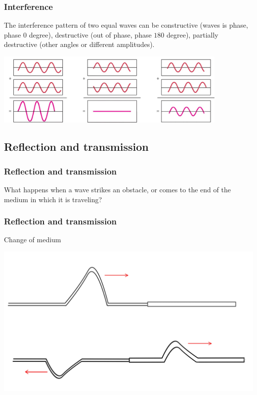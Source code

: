 \documentclass[]{beamer}
\begin{document}
\begin{frame}
  \frametitle{Interference }
  
  The interference pattern of two equal waves can be constructive (waves is phase, phase $0$ degree), destructive (out of phase, phase $180$ degree), partially destructive
  (other angles or different amplitudes).
  
  
  
  
  
  
  
    \begin{center}
    \includegraphics[height=1.4in]{images4/17.jpg}
  \end{center}
  
  
  







    \end{frame}


\subsection{Reflection and transmission}
\begin{frame}
\frametitle{Reflection and transmission }

What happens when  a wave strikes an obstacle, or comes to the end of the medium in which it is
traveling?


  \end{frame}







\begin{frame}
\frametitle{Reflection and transmission }

\textcolor{mypink1}{Change of medium}

  \begin{center}
  \includegraphics[height=2.in]{images4/reflection.jpg}
\end{center}



  \end{frame}
\end{document}
